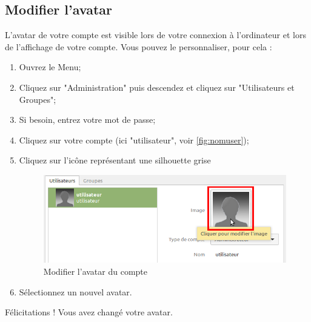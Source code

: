 \documentclass[12pt]{book}
\begin{document}
	\subsection{Modifier l'avatar}
		L'avatar de votre compte est visible lors de votre connexion à l'ordinateur et lors de l'affichage de votre compte.
		Vous pouvez le personnaliser, pour cela :
		\begin{enumerate}
			\item Ouvrez le Menu;
			\item Cliquez sur "Administration" puis descendez et cliquez sur "Utilisateurs et Groupes";
			\item Si besoin, entrez votre mot de passe;
			\item Cliquez sur votre compte (ici "utilisateur", voir \ref{fig:nomuser});
			\item Cliquez sur l'icône représentant une silhouette grise
			\begin{figure}[h]
				\centering
				\includegraphics[width=.78\textwidth]{include/avataruser.png}
				\caption{Modifier l'avatar du compte}
				\label{fig:avataruser}
			\end{figure}
			\item Sélectionnez un nouvel avatar.
		\end{enumerate}
		Félicitations ! Vous avez changé votre avatar.
\end{document}
